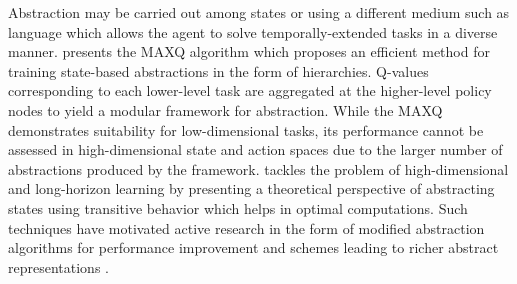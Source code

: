 \documentclass{article}
\begin{document}
Abstraction may be carried out among states \cite{program} or using a different medium such as language \cite{language} which allows the agent to solve temporally-extended tasks in a diverse manner. \cite{maxq} presents the MAXQ algorithm which proposes an efficient method for training state-based abstractions in the form of hierarchies. Q-values corresponding to each lower-level task are aggregated at the higher-level policy nodes to yield a modular framework for abstraction. While the MAXQ demonstrates suitability for low-dimensional tasks, its performance cannot be assessed in high-dimensional state and action spaces due to the larger number of abstractions produced by the framework. \cite{lifelong} tackles the problem of high-dimensional and long-horizon learning by presenting a theoretical perspective of abstracting states using transitive behavior which helps in optimal computations. Such techniques have motivated active research in the form of modified abstraction algorithms for performance improvement and schemes leading to richer abstract representations \cite{evolutionary}. \\
\end{document}
